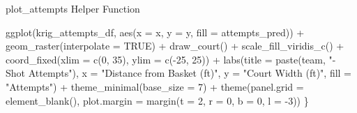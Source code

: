 \documentclass[
  9pt,
  ignorenonframetext,
  aspectratio=169]{beamer}
\newenvironment{Shaded}{\begin{snugshade}}{\end{snugshade}}
\newcommand{\AttributeTok}[1]{\textcolor[rgb]{0.00,0.34,0.68}{#1}}
\newcommand{\ConstantTok}[1]{\textcolor[rgb]{0.67,0.33,0.00}{#1}}
\newcommand{\DecValTok}[1]{\textcolor[rgb]{0.69,0.50,0.00}{#1}}
\newcommand{\FunctionTok}[1]{\textcolor[rgb]{0.39,0.29,0.61}{#1}}
\newcommand{\NormalTok}[1]{\textcolor[rgb]{0.12,0.11,0.11}{#1}}
\newcommand{\SpecialCharTok}[1]{\textcolor[rgb]{0.24,0.68,0.91}{#1}}
\newcommand{\StringTok}[1]{\textcolor[rgb]{0.75,0.01,0.01}{#1}}
\begin{document}
\begin{frame}[fragile]{plot\_attempts Helper Function}
\begin{Shaded}
\begin{Highlighting}[]
  \FunctionTok{ggplot}\NormalTok{(krig\_attempts\_df, }\FunctionTok{aes}\NormalTok{(}\AttributeTok{x =}\NormalTok{ x, }\AttributeTok{y =}\NormalTok{ y, }\AttributeTok{fill =}\NormalTok{ attempts\_pred)) }\SpecialCharTok{+}
    \FunctionTok{geom\_raster}\NormalTok{(}\AttributeTok{interpolate =} \ConstantTok{TRUE}\NormalTok{) }\SpecialCharTok{+}
    \FunctionTok{draw\_court}\NormalTok{() }\SpecialCharTok{+}
    \FunctionTok{scale\_fill\_viridis\_c}\NormalTok{() }\SpecialCharTok{+}
    \FunctionTok{coord\_fixed}\NormalTok{(}\AttributeTok{xlim =} \FunctionTok{c}\NormalTok{(}\DecValTok{0}\NormalTok{, }\DecValTok{35}\NormalTok{), }\AttributeTok{ylim =} \FunctionTok{c}\NormalTok{(}\SpecialCharTok{{-}}\DecValTok{25}\NormalTok{, }\DecValTok{25}\NormalTok{)) }\SpecialCharTok{+}
    \FunctionTok{labs}\NormalTok{(}\AttributeTok{title =} \FunctionTok{paste}\NormalTok{(team, }\StringTok{"{-} Shot Attempts"}\NormalTok{),}
         \AttributeTok{x =} \StringTok{"Distance from Basket (ft)"}\NormalTok{,}
         \AttributeTok{y =} \StringTok{"Court Width (ft)"}\NormalTok{,}
         \AttributeTok{fill =} \StringTok{"Attempts"}\NormalTok{) }\SpecialCharTok{+}
    \FunctionTok{theme\_minimal}\NormalTok{(}\AttributeTok{base\_size =} \DecValTok{7}\NormalTok{) }\SpecialCharTok{+}
    \FunctionTok{theme}\NormalTok{(}\AttributeTok{panel.grid =} \FunctionTok{element\_blank}\NormalTok{(),}
          \AttributeTok{plot.margin =} \FunctionTok{margin}\NormalTok{(}\AttributeTok{t =} \DecValTok{2}\NormalTok{, }\AttributeTok{r =} \DecValTok{0}\NormalTok{, }\AttributeTok{b =} \DecValTok{0}\NormalTok{, }\AttributeTok{l =} \SpecialCharTok{{-}}\DecValTok{3}\NormalTok{))}
\NormalTok{\}}
\end{Highlighting}
\end{Shaded}
\end{frame}
\end{document}
